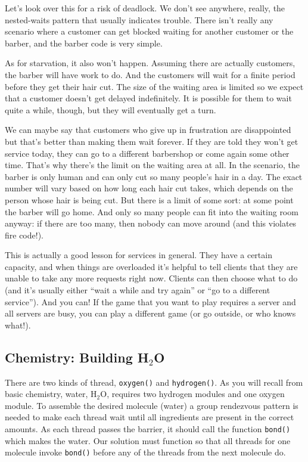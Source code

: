 \documentclass[a4paper]{report}
\begin{document}
Let's look over this for a risk of deadlock. We don't see anywhere, really, the nested-waits pattern that usually indicates trouble. There isn't really any scenario where a customer can get blocked waiting for another customer or the barber, and the barber code is very simple.

As for starvation, it also won't happen. Assuming there are actually customers, the barber will have work to do. And the customers will wait for a finite period before they get their hair cut. The size of the waiting area is limited so we expect that a customer doesn't get delayed indefinitely. It is possible for them to wait quite a while, though, but they will eventually get a turn.

We can maybe say that customers who give up in frustration are disappointed but that's better than making them wait forever. If they are told they won't get service today, they can go to a different barbershop or come again some other time. That's why there's the limit on the waiting area at all. In the scenario, the barber is only human and can only cut so many people's hair in a day. The exact number will vary based on how long each hair cut takes, which depends on the person whose hair is being cut. But there is a limit of some sort: at some point the barber will go home. And only so many people can fit into the waiting room anyway: if there are too many, then nobody can move around (and this violates fire code!).

This is actually a good lesson for services in general. They have a certain capacity, and when things are overloaded it's helpful to tell clients that they are unable to take any more requests right now. Clients can then choose what to do (and it's usually either ``wait a while and try again'' or ``go to a different service''). And you can! If the game that you want to play requires a server and all servers are busy, you can play a different game (or go outside, or who knows what!).


\subsection*{Chemistry: Building H$_{2}$O}
There are two kinds of thread, \texttt{oxygen()} and \texttt{hydrogen()}. As you will recall from basic chemistry, water, H$_{2}$O, requires two hydrogen modules and one oxygen module. To assemble the desired molecule (water) a group rendezvous pattern is needed to make each thread wait until all ingredients are present in the correct amounts. As each thread passes the barrier, it should call the function \texttt{bond()} which makes the water. Our solution must function so that all threads for one molecule invoke \texttt{bond()} before any of the threads from the next molecule do.
\end{document}
